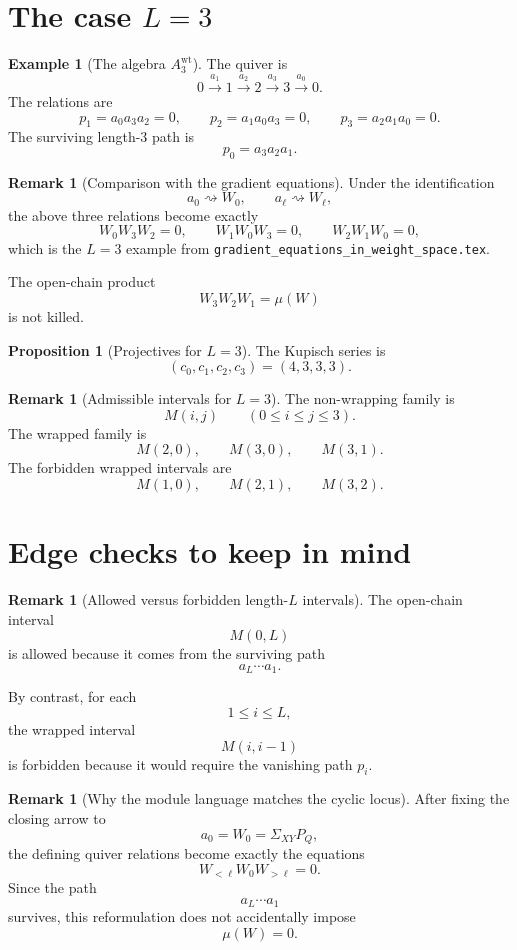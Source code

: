 \documentclass{article}
\theoremstyle{definition}
\newtheorem{proposition}[theorem]{Proposition}
\newtheorem{remark}[theorem]{Remark}
\newtheorem{example}[theorem]{Example}
\begin{document}
\section{The case $L=3$}

\begin{example}[The algebra $A_3^{\mathrm{wt}}$]
The quiver is
\[
0 \xrightarrow{a_1} 1 \xrightarrow{a_2} 2 \xrightarrow{a_3} 3 \xrightarrow{a_0} 0.
\]
The relations are
\[
p_1=a_0a_3a_2=0,
\qquad
p_2=a_1a_0a_3=0,
\qquad
p_3=a_2a_1a_0=0.
\]
The surviving length-$3$ path is
\[
p_0=a_3a_2a_1.
\]
\end{example}

\begin{remark}[Comparison with the gradient equations]
Under the identification
\[
a_0\rightsquigarrow W_0,
\qquad
a_\ell\rightsquigarrow W_\ell,
\]
the above three relations become exactly
\[
W_0W_3W_2=0,
\qquad
W_1W_0W_3=0,
\qquad
W_2W_1W_0=0,
\]
which is the $L=3$ example from
\texttt{gradient\_equations\_in\_weight\_space.tex}.

The open-chain product
\[
W_3W_2W_1
=
\mu(W)
\]
is not killed.
\end{remark}

\begin{proposition}[Projectives for $L=3$]
The Kupisch series is
\[
(c_0,c_1,c_2,c_3)=(4,3,3,3).
\]
\end{proposition}

\begin{remark}[Admissible intervals for $L=3$]
The non-wrapping family is
\[
M(i,j)
\qquad
(0\le i\le j\le 3).
\]
The wrapped family is
\[
M(2,0),\qquad M(3,0),\qquad M(3,1).
\]
The forbidden wrapped intervals are
\[
M(1,0),\qquad M(2,1),\qquad M(3,2).
\]
\end{remark}

\section{Edge checks to keep in mind}

\begin{remark}[Allowed versus forbidden length-$L$ intervals]
The open-chain interval
\[
M(0,L)
\]
is allowed because it comes from the surviving path
\[
a_L\cdots a_1.
\]

By contrast, for each
\[
1\le i\le L,
\]
the wrapped interval
\[
M(i,i-1)
\]
is forbidden because it would require the vanishing path $p_i$.
\end{remark}

\begin{remark}[Why the module language matches the cyclic locus]
After fixing the closing arrow to
\[
a_0=W_0=\Sigma_{XY}P_Q,
\]
the defining quiver relations become exactly the equations
\[
W_{<\ell}W_0W_{>\ell}=0.
\]
Since the path
\[
a_L\cdots a_1
\]
survives, this reformulation does not accidentally impose
\[
\mu(W)=0.
\]
\end{remark}
\end{document}
